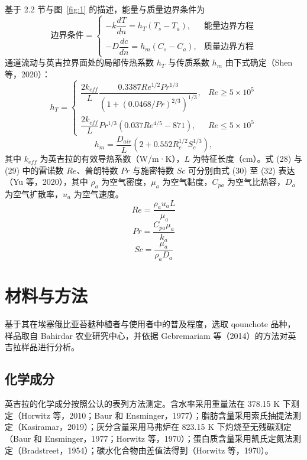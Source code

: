 \documentclass[11pt,a4paper]{ctexart}
\begin{document}
基于 2.2 节与图~\ref{fig:1} 的描述，能量与质量边界条件为
\begin{equation}
\text{边界条件} =
\begin{cases}
-k\dfrac{dT}{dn} = h_T(T_s - T_a), & \text{能量边界方程}\\[8pt]
-D\dfrac{dc}{dn} = h_m(C_s - C_a), & \text{质量边界方程}
\end{cases}
\end{equation}
通道流动与英吉拉界面处的局部传热系数 $h_T$ 与传质系数 $h_m$ 由下式确定（Shen 等，2020）：
\begin{equation}
h_T =
\begin{cases}
\dfrac{2k_{eff}}{L}\dfrac{0.3387Re^{1/2}Pr^{1/3}}{\left(1+(0.0468/Pr)^{2/3}\right)^{1/3}}, & Re \ge 5\times10^{5}\\[10pt]
\dfrac{2k_{eff}}{L}Pr^{1/3}\left(0.037Re^{4/5}-871\right), & Re \le 5\times10^{5}
\end{cases}
\end{equation}
\begin{equation}
h_m = \frac{D_{air}}{L}\left(2 + 0.552R_e^{1/2}S_c^{1/3}\right),
\end{equation}
其中 $k_{eff}$ 为英吉拉的有效导热系数（W/m·K），$L$ 为特征长度（cm）。式 (28) 与 (29) 中的雷诺数 $Re$、普朗特数 $Pr$ 与施密特数 $Sc$ 可分别由式 (30) 至 (32) 表达（Yu 等，2020），其中 $\rho_a$ 为空气密度，$\mu_a$ 为空气黏度，$C_{pa}$ 为空气比热容，$D_a$ 为空气扩散率，$u_a$ 为空气速度。
\begin{equation}
Re = \frac{\rho_a u_a L}{\mu_a}
\end{equation}
\begin{equation}
Pr = \frac{C_{pa}\mu_a}{k_a}
\end{equation}
\begin{equation}
Sc = \frac{\mu_a}{\rho_a D_a}
\end{equation}

\section{材料与方法}

基于其在埃塞俄比亚苔麸种植者与使用者中的普及程度，选取 qounchote 品种，样品取自 Bahirdar 农业研究中心，并依据 Gebremariam 等（2014）的方法对英吉拉样品进行分析。

\subsection{化学成分}

英吉拉的化学成分按照公认的表列方法测定。含水率采用重量法在 378.15 K 下测定（Horwitz 等，2010；Baur 和 Ensminger，1977）；脂肪含量采用索氏抽提法测定（Kasiramar，2019）；灰分含量采用马弗炉在 823.15 K 下灼烧至无残碳测定（Baur 和 Ensminger，1977；Horwitz 等，1970）；蛋白质含量采用凯氏定氮法测定（Bradstreet，1954）；碳水化合物由差值法得到（Horwitz 等，1970）。
\end{document}
